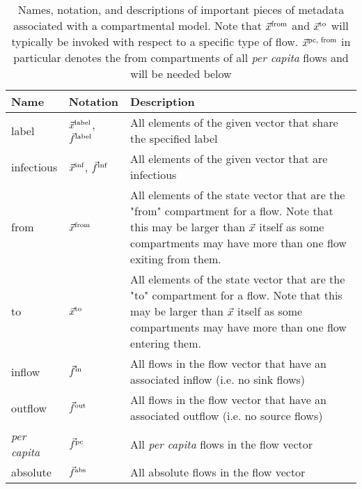 \begin{table}
\centering
    \begin{tabular}{|m{1.5cm}|m{1.5cm}|m{30em}|}
        \hline
        Name & Notation & Description \\\hline
        label & $\vec{x}^{\text{label}}$, $\vec{f}^{\text{label}}$ & All elements of the given vector that share the specified label \\\hline
        infectious & $\vec{x}^{\text{inf}}$, $\vec{f}^{\text{inf}}$ & All elements of the given vector that are infectious \\\hline
        from & $\vec{x}^\text{from}$ & All elements of the state vector that are the "from" compartment for a flow. Note that this may be larger than $\vec{x}$ itself as some compartments may have more than one flow exiting from them. \\\hline
        to & $\vec{x}^\text{to}$ & All elements of the state vector that are the "to" compartment for a flow. Note that this may be larger than $\vec{x}$ itself as some compartments may have more than one flow entering them. \\\hline
        inflow & $\vec{f}^\text{in}$ & All flows in the flow vector that have an associated inflow (i.e. no sink flows) \\\hline
        outflow & $\vec{f}^\text{out}$ & All flows in the flow vector that have an associated outflow (i.e. no source flows) \\\hline
        \emph{per capita} & $\vec{f}^\text{pc}$ & All \emph{per capita} flows in the flow vector \\\hline
        absolute & $\vec{f}^\text{abs}$ & All absolute flows in the flow vector \\\hline
    \end{tabular}
    \caption{Names, notation, and descriptions of important pieces of metadata associated with a compartmental model. Note that $\vec{x}^\text{from}$ and $\vec{x}^\text{to}$ will typically be invoked with respect to a specific type of flow. $\vec{x}^\text{pc, from}$ in particular denotes the from compartments of all \emph{per capita} flows and will be needed below}
    \label{tab:projections}
\end{table}
    
